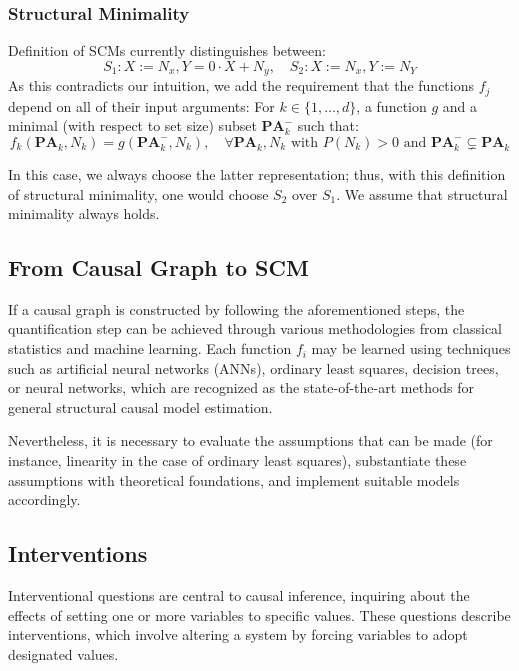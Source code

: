 \documentclass{article}
\begin{document}
	\subsubsection*{Structural Minimality}
	
	Definition of SCMs currently distinguishes between: $$S_1: X := N_x, Y = 0 \cdot X + N_y, \quad S_2: X := N_x, Y := N_Y$$ As this contradicts our intuition, we add the requirement that the functions $f_j$ depend on all of their input arguments: For $k \in \{1, \dots, d\}$, a function $g$ and a minimal (with respect to set size) subset $\mathbf{PA}_k^-$ such that: $$f_k (\mathbf{PA}_k, N_k) = g(\mathbf{PA}_k^-, N_k), \quad \forall \mathbf{PA}_k, N_k \text{ with } P(N_k) > 0 \text{ and } \mathbf{PA}_k^- \subsetneq \mathbf{PA}_k$$
	
	In this case, we always choose the latter representation; thus, with this definition of structural minimality, one would choose $S_2$ over $S_1$. We assume that structural minimality always holds.
	
	\subsection{From Causal Graph to SCM}

	If a causal graph is constructed by following the aforementioned steps, the quantification step can be achieved through various methodologies from classical statistics and machine learning. Each function $f_i$ may be learned using techniques such as artificial neural networks (ANNs), ordinary least squares, decision trees, or neural networks, which are recognized as the state-of-the-art methods for general structural causal model estimation.
	
	Nevertheless, it is necessary to evaluate the assumptions that can be made (for instance, linearity in the case of ordinary least squares), substantiate these assumptions with theoretical foundations, and implement suitable models accordingly.
	
	\subsection{Interventions}
	
	Interventional questions are central to causal inference, inquiring about the effects of setting one or more variables to specific values. These questions describe interventions, which involve altering a system by forcing variables to adopt designated values.
	
\end{document}
